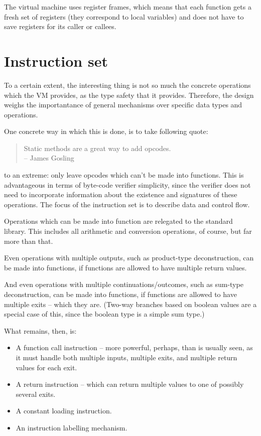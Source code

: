 \documentclass[a4paper]{book}
\begin{document}
The virtual machine uses register frames, which means that each
function gets a fresh set of registers (they correspond to local
variables) and does not have to save registers for its caller or callees.

\section{Instruction set}
To a certain extent, the interesting thing is not so much the
concrete operations which the VM provides, as the type safety that it
provides.
Therefore, the design weighs the importantance of general mechanisms
over specific data types and operations.

\smallskip
One concrete way in which this is done, is to take following quote:
\begin{quote}
Static methods are a great way to add opcodes.\\
\raggedleft
-- James Gosling
\end{quote}
to an extreme: only leave opcodes which can't be made into functions.
This is advantageous in terms of byte-code verifier simplicity, since
the verifier does not need to incorporate information about the
existence and signatures of these operations.
The focus of the instruction set is to describe data and control flow.

Operations which can be made into function are relegated to the
standard library. This includes all arithmetic and conversion
operations, of course, but far more than that.

Even operations with multiple outputs, such as product-type deconstruction,
can be made into functions, if functions are allowed to have multiple
return values.

And even operations with multiple continuations/outcomes, such as
sum-type deconstruction, can be made into functions, if functions are
allowed to have multiple exits -- which they are.
(Two-way branches based on boolean values are a special case of this,
since the boolean type is a simple sum type.)

\smallskip
What remains, then, is:
\begin{itemize}\def\itemsep{0pt}
\item A function call instruction -- more powerful, perhaps, than is
  usually seen, as it must handle both multiple inputs, multiple
  exits, and multiple return values for each exit.
\item A return instruction -- which can return multiple values to one
  of possibly several exits.
\item A constant loading instruction.
\item An instruction labelling mechanism.
\end{itemize}
\end{document}
